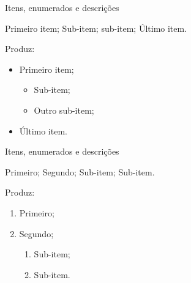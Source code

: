\begin{frame}{Itens, enumerados e descrições}
\begin{LaTeXcode}
 \n
{} Primeiro item; \n
{} \n
{} Sub-item; \n
{} sub-item; \n
{} \n
{} Último item. \n
{}
\end{LaTeXcode}

Produz:
\begin{LaTeXoutput}
\begin{itemize}
\item Primeiro item;
\begin{itemize}
\item Sub-item;
\item Outro sub-item;
\end{itemize}
\item Último item.
\end{itemize}
\end{LaTeXoutput}
\end{frame}

\begin{frame}{Itens, enumerados e descrições}
\begin{LaTeXcode}
 \n
{} Primeiro; \n
{} Segundo; \n
{} \n
{} Sub-item; \n
{} Sub-item. \n
{} \n
{}
\end{LaTeXcode}

Produz:
\begin{LaTeXoutput}
\begin{enumerate}
\item Primeiro;
\item Segundo;
\begin{enumerate}
\item Sub-item;
\item Sub-item.
\end{enumerate}
\end{enumerate}
\end{LaTeXoutput}
\end{frame}

